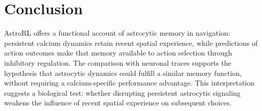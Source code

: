 \section{Conclusion}
AstroRL offers a functional account of astrocytic memory in navigation: persistent calcium dynamics retain recent spatial experience, while predictions of action outcomes make that memory available to action selection through inhibitory regulation. The comparison with neuronal traces supports the hypothesis that astrocytic dynamics could fulfill a similar memory function, without requiring a calcium-specific performance advantage. This interpretation suggests a biological test: whether disrupting persistent astrocytic signaling weakens the influence of recent spatial experience on subsequent choices.